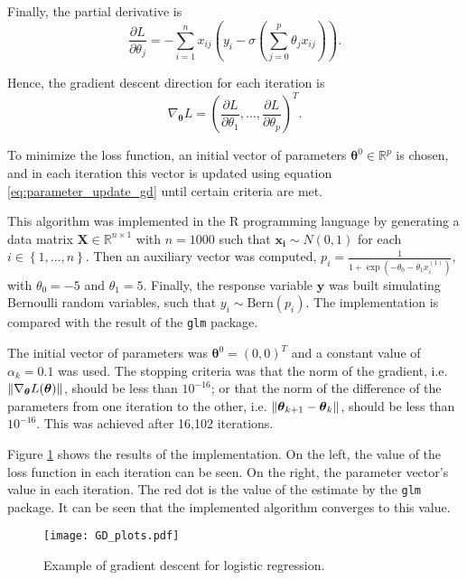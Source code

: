 Finally, the partial derivative is
\begin{equation}
  \frac{\partial L}{\partial \theta_j} = - \sum_{i = 1}^n { x_{ij}(y_i - \sigma(\sum_{j=0}^{p}{\theta_j x_{ij}})) }.
\end{equation}

Hence, the gradient descent direction for each iteration is
\begin{equation}
  \nabla_{\boldsymbol{\theta}} L = \left( \frac{\partial L}{\partial \theta_1}, ..., \frac{\partial L}{\partial \theta_p} \right)^T.
\end{equation}

To minimize the loss function, an initial vector of parameters $\boldsymbol{\theta}^0 \in \mathbb{R}^p$ is chosen, and in each iteration this vector is updated using equation \eqref{eq:parameter_update_gd} until certain criteria are met.

This algorithm was implemented in the R programming language \cite{R_manual} by generating a data matrix $\boldsymbol{X} \in \mathbb{R}^{n \times 1}$ with $n = 1000$ such that $\boldsymbol{x_i} \sim N(0, 1)$ for each $i \in \left\{1, ..., n \right\}$.
Then an auxiliary vector was computed, $p_i = \frac{1}{1 + \exp \left( - \theta_0 - \theta_1 x_i^{(1)} \right)}$, with $\theta_0 = -5$ and $\theta_1 = 5$. Finally, the response variable $\boldsymbol{y}$ was built simulating Bernoulli random variables, such that $y_i \sim \mathrm{Bern}(p_i)$.
The implementation is compared with the result of the \texttt{glm} package.

The initial vector of parameters was $\boldsymbol{\theta}^0 = (0, 0)^T$ and a constant value of $\alpha_k = 0.1$ was used. The stopping criteria was that the norm of the gradient, i.e. $\left\lVert \nabla_{\boldsymbol{\theta}} L(\boldsymbol{\theta}) \right\rVert$, should be less than $10^{-16}$; or that the norm of the difference of the parameters from one iteration to the other, i.e. $\left\lVert \boldsymbol{\theta}_{k+1} - \boldsymbol{\theta}_k \right\rVert$, should be less than $10^{-16}$. This was achieved after 16,102 iterations.

Figure \ref{fig:GD_plots} shows the results of the implementation. On the left, the value of the loss function in each iteration can be seen. On the right, the parameter vector's value in each iteration. The red dot is the value of the estimate by the \texttt{glm} package. It can be seen that the implemented algorithm converges to this value.

\begin{figure}[H]
    \centering
    \texttt{[image: GD\_plots.pdf]}
    \caption{Example of gradient descent for logistic regression.}
    \label{fig:GD_plots}
\end{figure}

